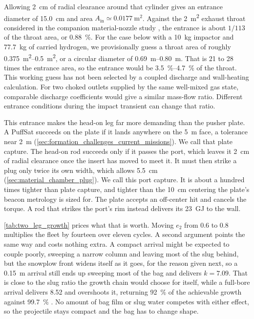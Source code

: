 \documentclass{article}
\begin{document}
Allowing \SI{2}{\centi\meter} of radial clearance around that cylinder gives an entrance diameter of \SI{15.0}{\centi\meter} and area $A_{\mathrm{in}}\simeq\SI{0.0177}{\square\meter}$. Against the \SI{2}{\square\meter} exhaust throat considered in the companion material-nozzle study \cite{Katz_puffsat_impact_sim_2026}, the entrance is about $1/113$ of the throat area, or \SI{0.88}{\percent}. For the case below with a \SI{10}{\kilogram} impactor and \SI{77.7}{\kilogram} of carried hydrogen, we provisionally guess a throat area of roughly \SIrange{0.375}{0.5}{\square\meter}, or a circular diameter of \SIrange{0.69}{0.80}{\meter}. That is 21 to 28 times the entrance area, so the entrance would be \SIrange{3.5}{4.7}{\percent} of the throat. This working guess has not been selected by a coupled discharge and wall-heating calculation. For two choked outlets supplied by the same well-mixed gas state, comparable discharge coefficients would give a similar mass-flow ratio. Different entrance conditions during the impact transient can change that ratio.

This entrance makes the head-on leg far more demanding than the pusher plate. A PuffSat succeeds on the plate if it lands anywhere on the \SI{5}{\meter} face, a tolerance near \SI{2}{\meter} (\autoref{sec:formation_challenges_current_missions}). We call that plate capture. The head-on rod succeeds only if it passes the port, which leaves it \SI{2}{\centi\meter} of radial clearance once the insert has moved to meet it. It must then strike a plug only twice its own width, which allows \SI{5.5}{\centi\meter} (\autoref{sec:material_chamber_plug}). We call this port capture. It is about a hundred times tighter than plate capture, and tighter than the \SI{10}{\centi\meter} centering the plate's beacon metrology is sized for. The plate accepts an off-center hit and cancels the torque. A rod that strikes the port's rim instead delivers its \SI{23}{\giga\joule} to the wall.

\autoref{tab:two_leg_growth} prices what that is worth. Moving $e_2$ from 0.6 to 0.8 multiplies the fleet by fourteen over eleven cycles. A second argument points the same way and costs nothing extra. A compact arrival might be expected to couple poorly, sweeping a narrow column and leaving most of the slug behind, but the snowplow front widens itself as it goes, for the reason given next, so a \SI{0.15}{\meter} arrival still ends up sweeping most of the bag and delivers $k = 7.09$. That is close to the slug ratio the growth chain would choose for itself, while a full-bore arrival delivers 8.52 and overshoots it, returning \SI{92}{\percent} of the achievable growth against \SI{99.7}{\percent} \cite{Katz_aim_is_all_you_need_2025}. No amount of bag film or slug water competes with either effect, so the projectile stays compact and the bag has to change shape.
\end{document}
